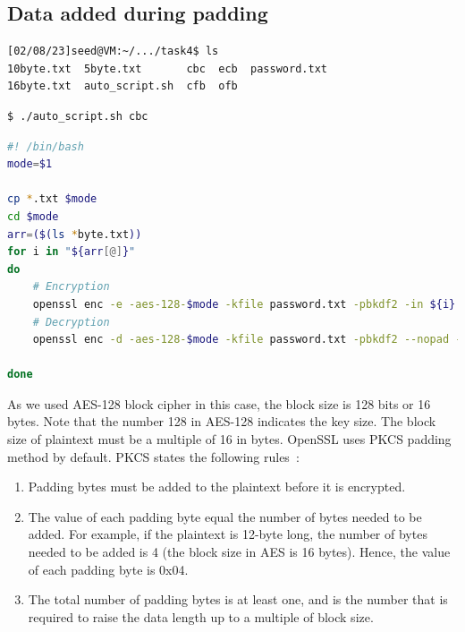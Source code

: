 \subsection{Data added during padding}
%
\begin{lstlisting}[language=Bash, caption=Files inside the
    the task4 folder]
[02/08/23]seed@VM:~/.../task4$ ls
10byte.txt  5byte.txt       cbc  ecb  password.txt
16byte.txt  auto_script.sh  cfb  ofb
\end{lstlisting}

\begin{lstlisting}[language=Bash, caption=Using {\fontfamily{qcr}\selectfont
    auto\_script.sh} with the CBC mode., label={lst:auto_script_example}]
$ ./auto_script.sh cbc
\end{lstlisting}

\begin{lstlisting}[language=Bash, caption=Automating script for discovering
    what was added to the padding during encryption/decryption ({\fontfamily{qcr}
    \selectfont auto\_script.sh}), label={lst:padding_script}]
#! /bin/bash
mode=$1

cp *.txt $mode
cd $mode
arr=($(ls *byte.txt))
for i in "${arr[@]}"
do
    # Encryption
    openssl enc -e -aes-128-$mode -kfile password.txt -pbkdf2 -in ${i} -out ${i}.enc
    # Decryption
    openssl enc -d -aes-128-$mode -kfile password.txt -pbkdf2 --nopad -in ${i}.enc -out ${i}.dec

done
\end{lstlisting}

As we used AES-128 block cipher in this case, the block size is 128 bits or 16 bytes.
Note that the number 128 in AES-128 indicates the key size. The block size of plaintext
must be a multiple of 16 in bytes. OpenSSL uses PKCS padding method by default. PKCS
states the following rules~\cite{pkcs_padding}:
\begin{enumerate}
    \item Padding bytes must be added to the plaintext before it is encrypted.
    \item The value of each padding byte equal the number of bytes needed to be added.
    For example, if the plaintext is 12-byte long, the number of bytes needed to be added
    is 4 (the block size in AES is 16 bytes). Hence, the value of each padding byte is 0x04.
    \item The total number of padding bytes is at least one, and is the number that is
    required to raise the data length up to a multiple of block size.
\end{enumerate}

